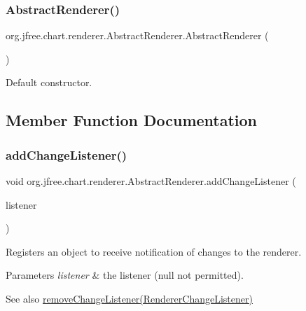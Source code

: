 \subsubsection{\texorpdfstring{Abstract\+Renderer()}{AbstractRenderer()}}
{\footnotesize\ttfamily org.\+jfree.\+chart.\+renderer.\+Abstract\+Renderer.\+Abstract\+Renderer (\begin{DoxyParamCaption}{ }\end{DoxyParamCaption})}

Default constructor. 

\subsection{Member Function Documentation}
\mbox{\label{classorg_1_1jfree_1_1chart_1_1renderer_1_1_abstract_renderer_a3b6e875102983611e9dfcd174b810920}} 
\subsubsection{\texorpdfstring{add\+Change\+Listener()}{addChangeListener()}}
{\footnotesize\ttfamily void org.\+jfree.\+chart.\+renderer.\+Abstract\+Renderer.\+add\+Change\+Listener (\begin{DoxyParamCaption}\item[{\mbox{\hyperlink{interfaceorg_1_1jfree_1_1chart_1_1event_1_1_renderer_change_listener}{Renderer\+Change\+Listener}}}]{listener }\end{DoxyParamCaption})}

Registers an object to receive notification of changes to the renderer.


\begin{DoxyParams}{Parameters}
{\em listener} & the listener ({\ttfamily null} not permitted).\\
\hline
\end{DoxyParams}
\begin{DoxySeeAlso}{See also}
\mbox{\hyperlink{classorg_1_1jfree_1_1chart_1_1renderer_1_1_abstract_renderer_ad051bf1700aac21a28e545e79ba1d7b3}{remove\+Change\+Listener(\+Renderer\+Change\+Listener)}} 
\end{DoxySeeAlso}
\mbox{\label{classorg_1_1jfree_1_1chart_1_1renderer_1_1_abstract_renderer_a0caeba8ab3f4f349f4a1ad1151f6aa84}} 
